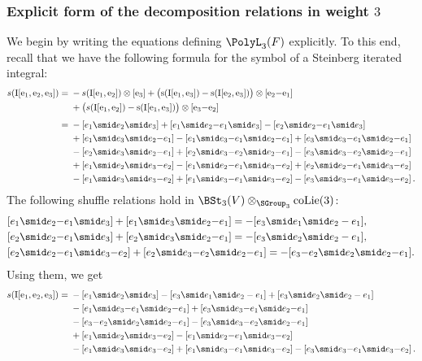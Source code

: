 \documentclass[a4paper]{amsart}
\begin{document}
\subsubsection{Explicit form of the decomposition relations in weight $3$}\label{sec:decomp-rels-wt-3}
We begin by writing the equations defining $\PolyL_3(F)$ explicitly. To this end, recall that we have the following formula for the symbol of a Steinberg iterated integral:
\begin{align*}
s(\rm{I}[e_1,e_2,e_3]) = {} & 
 -s(\rm{I}[e_1,e_2])\otimes[e_3]
+\big(s(\rm{I}[e_1,e_3])
-s(\rm{I}[e_2,e_3])\big)\otimes[e_2{-}e_1] \\
& 
{} +\big(s(\rm{I}[e_1,e_2])-s(\rm{I}[e_1,e_3])\big)\otimes[e_3{-}e_2]\\[1ex]
= {} & - [e_1 \smid e_2 \smid e_3]+[e_1 \smid e_2{-}e_1 \smid e_3]-[e_2 \smid e_2{-}e_1 \smid e_3]
\\
 &+[e_1 \smid e_3 \smid e_2{-}e_1]-[e_1 \smid e_3{-}e_1 \smid e_2{-}e_1]+[e_3 \smid e_3{-}e_1 \smid e_2{-}e_1]\\
 &-[e_2 \smid e_3 \smid e_2{-}e_1]+[e_2 \smid e_3{-}e_2 \smid e_2{-}e_1]-[e_3 \smid e_3{-}e_2 \smid e_2{-}e_1]\\
 &+[e_1 \smid e_2 \smid e_3{-}e_2]-[e_1 \smid e_2{-}e_1 \smid e_3{-}e_2]+[e_2 \smid e_2{-}e_1 \smid e_3{-}e_2]\\
 &-[e_1 \smid e_3 \smid e_3{-}e_2]+[e_1 \smid e_3{-}e_1 \smid e_3{-}e_2]-[e_3 \smid e_3{-}e_1 \smid e_3{-}e_2]\,.
\end{align*}
The following shuffle relations hold in $\BSt_3(V)\otimes_{\SGroup_3}\rm{coLie}(3)$:
\begin{align*}
&[e_1 \smid e_2{-}e_1 \smid e_3]+[e_1 \smid e_3 \smid e_2{-}e_1]=-[e_3\smid e_1\smid e_2-e_1],\\
&[e_2 \smid e_2{-}e_1 \smid e_3]+[e_2 \smid e_3 \smid e_2{-}e_1]=-[e_3\smid e_2 \smid e_2-e_1],\\
&[e_2 \smid e_2{-}e_1 \smid e_3{-}e_2]+[e_2 \smid e_3{-}e_2 \smid e_2{-}e_1]=-
[e_3{-}e_2 \smid e_2 \smid e_2{-}e_1].
\end{align*}
Using them, we get
\begin{align*}
s(\rm{I}[e_1,e_2,e_3]) = 
 {} & - [e_1 \smid e_2 \smid e_3]-[e_3\smid e_1\smid e_2-e_1]+[e_3\smid e_2 \smid e_2-e_1]
\\
 &-[e_1 \smid e_3{-}e_1 \smid e_2{-}e_1]+[e_3 \smid e_3{-}e_1 \smid e_2{-}e_1]\\
 &-[e_3{-}e_2 \smid e_2 \smid e_2{-}e_1]-[e_3 \smid e_3{-}e_2 \smid e_2{-}e_1]\\
 &+[e_1 \smid e_2 \smid e_3{-}e_2]-[e_1 \smid e_2{-}e_1 \smid e_3{-}e_2]\\
 &-[e_1 \smid e_3 \smid e_3{-}e_2]+[e_1 \smid e_3{-}e_1 \smid e_3{-}e_2]-[e_3 \smid e_3{-}e_1 \smid e_3{-}e_2]\,.
\end{align*}
\end{document}
